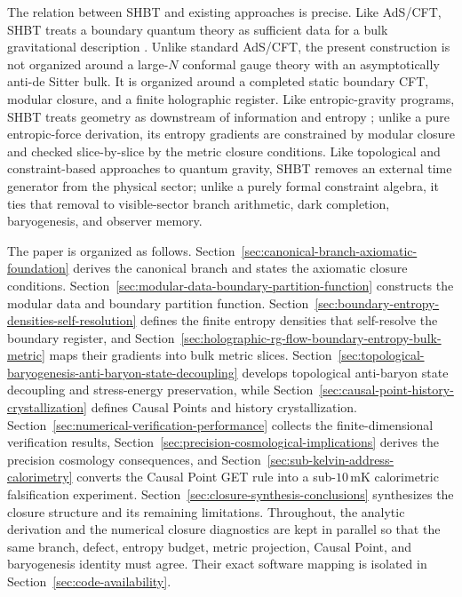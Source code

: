 \documentclass[11pt,letterpaper]{article}
\theoremstyle{plain}
\begin{document}
The relation between SHBT and existing approaches is precise.  Like AdS/CFT,
SHBT treats a boundary quantum theory as sufficient
data for a bulk gravitational description \cite{maldacena1998,gkp1998,witten1998}.
Unlike standard AdS/CFT, the present construction is not organized around a
large-$N$ conformal gauge theory with an asymptotically anti-de Sitter bulk.  It
is organized around a completed static boundary CFT, modular closure, and a
finite holographic register.  Like entropic-gravity programs, SHBT treats
geometry as downstream of information and entropy \cite{verlinde2011}; unlike a
pure entropic-force derivation, its entropy gradients are constrained by modular
closure and checked slice-by-slice by the metric closure conditions.  Like
topological and constraint-based approaches to quantum gravity, SHBT removes an
external time generator from the physical sector; unlike a purely formal
constraint algebra, it ties that removal to visible-sector branch arithmetic,
dark completion, baryogenesis, and observer memory.

The paper is organized as follows.  Section~\ref{sec:canonical-branch-axiomatic-foundation}
derives the canonical branch and states the axiomatic closure conditions.
Section~\ref{sec:modular-data-boundary-partition-function} constructs the
modular data and boundary partition function.  Section~\ref{sec:boundary-entropy-densities-self-resolution}
defines the finite entropy densities that self-resolve the boundary register,
and Section~\ref{sec:holographic-rg-flow-boundary-entropy-bulk-metric} maps
their gradients into bulk metric slices.  Section~\ref{sec:topological-baryogenesis-anti-baryon-state-decoupling}
develops topological anti-baryon state decoupling and stress-energy preservation, while
Section~\ref{sec:causal-point-history-crystallization} defines Causal Points
and history crystallization.  Section~\ref{sec:numerical-verification-performance}
collects the finite-dimensional verification results,
Section~\ref{sec:precision-cosmological-implications} derives the precision
cosmology consequences, and
Section~\ref{sec:sub-kelvin-address-calorimetry} converts the Causal Point GET
rule into a sub-\(10\,\mathrm{mK}\) calorimetric falsification experiment.
Section~\ref{sec:closure-synthesis-conclusions} synthesizes the closure structure
and its remaining limitations.  Throughout,
the analytic derivation and the numerical closure diagnostics are kept in
parallel so that the same branch, defect, entropy budget, metric projection,
Causal Point, and baryogenesis identity must agree.  Their exact software
mapping is isolated in Section~\ref{sec:code-availability}.
\end{document}
